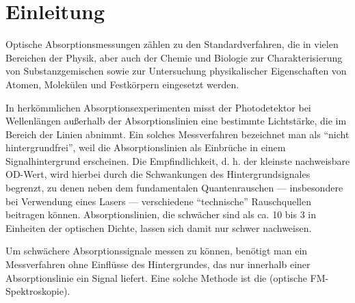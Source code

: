 
\chapter{Einleitung}
\label{chap:einleitung}

Optische Absorptionsmessungen zählen zu den Standardverfahren, die in vielen Bereichen der Physik, aber auch der Chemie und Biologie zur Charakterisierung von Substanzgemischen sowie zur Untersuchung physikalischer Eigenschaften von Atomen, Molekülen und Festkörpern eingesetzt werden.

In herkömmlichen Absorptionsexperimenten misst der Photodetektor bei Wellenlängen außerhalb der Absorptionslinien eine bestimmte Lichtstärke, die im Bereich der Linien abnimmt. Ein solches Messverfahren bezeichnet man als “nicht hintergrundfrei”, weil die Absorptionslinien als Einbrüche in einem Signalhintergrund erscheinen. Die Empfindlichkeit, d. h. der kleinste nachweisbare OD-Wert, wird hierbei durch die Schwankungen des Hintergrundsignales begrenzt, zu denen neben dem fundamentalen Quantenrauschen — insbesondere bei Verwendung eines Lasers — verschiedene “technische” Rauschquellen beitragen können. Absorptionslinien, die schwächer sind als ca. 10 bis 3 in Einheiten der optischen Dichte, lassen sich damit nur schwer nachweisen.

Um schwächere Absorptionssignale messen zu können, benötigt man ein Messverfahren ohne Einflüsse des Hintergrundes, das nur innerhalb einer Absorptionslinie ein Signal liefert. Eine solche Methode ist die  (optische FM-Spektroskopie). \cite{anleitung}